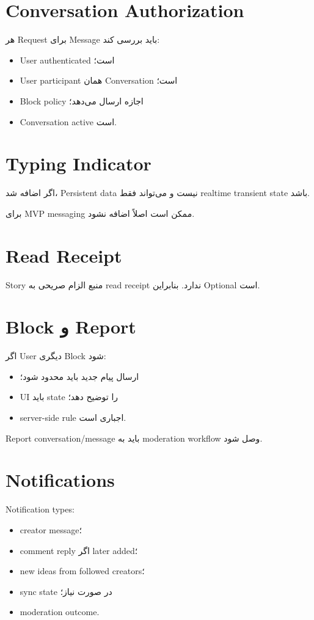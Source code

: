 \section{Conversation Authorization}

هر Request برای Message باید بررسی کند:
\begin{itemize}
  \item User authenticated است؛
  \item User participant همان Conversation است؛
  \item Block policy اجازه ارسال می‌دهد؛
  \item Conversation active است.
\end{itemize}

\section{Typing Indicator}

اگر اضافه شد، Persistent data نیست و می‌تواند فقط realtime transient state باشد.

برای MVP messaging ممکن است اصلاً اضافه نشود.

\section{Read Receipt}

Story منبع الزام صریحی به read receipt ندارد. بنابراین Optional است.

\section{Block و Report}

اگر User دیگری Block شود:
\begin{itemize}
  \item ارسال پیام جدید باید محدود شود؛
  \item UI باید state را توضیح دهد؛
  \item server-side rule اجباری است.
\end{itemize}

Report conversation/message باید به moderation workflow وصل شود.

\section{Notifications}

Notification types:
\begin{itemize}
  \item creator message؛
  \item comment reply اگر later added؛
  \item new ideas from followed creators؛
  \item sync state در صورت نیاز؛
  \item moderation outcome.
\end{itemize}

